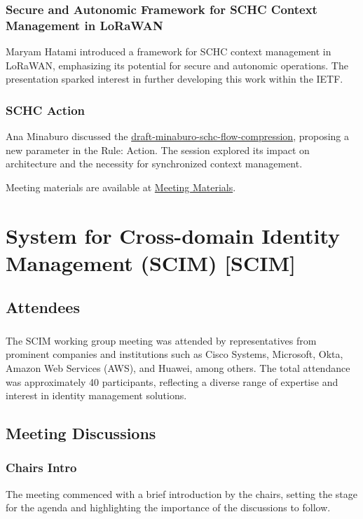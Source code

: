 \documentclass{article}
\begin{document}
\subsubsection{Secure and Autonomic Framework for SCHC Context Management in LoRaWAN}
Maryam Hatami introduced a framework for SCHC context management in LoRaWAN, emphasizing its potential for secure and autonomic operations. The presentation sparked interest in further developing this work within the IETF.

\subsubsection{SCHC Action}
Ana Minaburo discussed the \href{https://datatracker.ietf.org/doc/html/draft-minaburo-schc-flow-compression}{draft-minaburo-schc-flow-compression}, proposing a new parameter in the Rule: Action. The session explored its impact on architecture and the necessity for synchronized context management.

Meeting materials are available at \href{https://datatracker.ietf.org/meeting/121/session/schc}{Meeting Materials}.




\newpage

\section{System for Cross-domain Identity Management (SCIM) [SCIM]}

\subsection{Attendees}
\subsubsection{}
The SCIM working group meeting was attended by representatives from prominent companies and institutions such as Cisco Systems, Microsoft, Okta, Amazon Web Services (AWS), and Huawei, among others. The total attendance was approximately 40 participants, reflecting a diverse range of expertise and interest in identity management solutions.

\subsection{Meeting Discussions}

\subsubsection{Chairs Intro}
The meeting commenced with a brief introduction by the chairs, setting the stage for the agenda and highlighting the importance of the discussions to follow.
\end{document}
